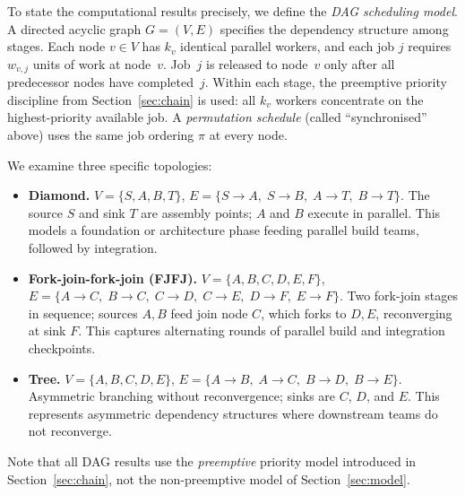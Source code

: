 \documentclass[11pt,titlepage]{article}
\begin{document}
To state the computational results precisely, we define
the \emph{DAG scheduling model}.  A directed acyclic graph
$G = (V, E)$ specifies the dependency structure among
stages.  Each node $v \in V$ has $k_v$ identical parallel
workers, and each job $j$ requires $w_{v,j}$ units of work
at node~$v$.  Job~$j$ is released to node~$v$ only after
all predecessor nodes have completed~$j$.  Within each
stage, the preemptive priority discipline from
Section~\ref{sec:chain} is used: all $k_v$ workers
concentrate on the highest-priority available job.  A
\emph{permutation schedule} (called ``synchronised'' above)
uses the same job ordering $\pi$ at every node.

We examine three specific topologies:
\begin{itemize}
\item \textbf{Diamond.}
  $V = \{S, A, B, T\}$, $E = \{S \!\to\! A,\; S \!\to\! B,\;
  A \!\to\! T,\; B \!\to\! T\}$.
  The source $S$ and sink $T$ are assembly points; $A$ and
  $B$ execute in parallel.  This models a foundation or
  architecture phase feeding parallel build teams, followed
  by integration.
\item \textbf{Fork-join-fork-join (FJFJ).}
  $V = \{A, B, C, D, E, F\}$,
  $E = \{A \!\to\! C,\; B \!\to\! C,\; C \!\to\! D,\;
  C \!\to\! E,\; D \!\to\! F,\; E \!\to\! F\}$.
  Two fork-join stages in sequence; sources $A,B$ feed
  join node $C$, which forks to $D,E$, reconverging at
  sink $F$.  This captures alternating rounds of parallel
  build and integration checkpoints.
\item \textbf{Tree.}
  $V = \{A, B, C, D, E\}$,
  $E = \{A \!\to\! B,\; A \!\to\! C,\; B \!\to\! D,\;
  B \!\to\! E\}$.
  Asymmetric branching without reconvergence; sinks are
  $C$, $D$, and $E$.  This represents asymmetric dependency
  structures where downstream teams do not reconverge.
\end{itemize}

\noindent
Note that all DAG results use the \emph{preemptive}
priority model introduced in Section~\ref{sec:chain}, not
the non-preemptive model of Section~\ref{sec:model}.
\end{document}
